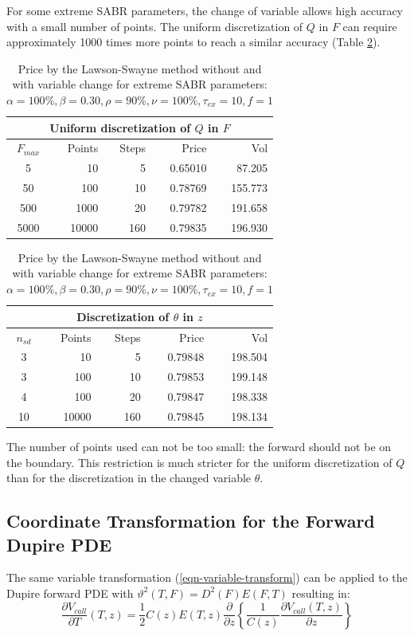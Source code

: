 \documentclass[]{rAMF2e}
\begin{document}
For some extreme SABR parameters, the change of variable allows high accuracy with a small number of points. The uniform discretization of $Q$ in $F$ can require approximately 1000 times more points to reach a similar accuracy (Table \ref{table:discretization}).
\begin{table}[h]
\begin{center}
\begin{tabular}{|c|r|r|r|r|}
	\hline
\multicolumn{5}{|c|}{Uniform discretization of $Q$ in $F$} \\ \hline
$F_{max}$ & Points & Steps & Price & Vol \\
5 & 10 & 5 & 0.65010 & 87.205  \\
50 & 100 & 10 & 0.78769 & 155.773\\
500 & 1000 & 20 & 0.79782 & 191.658 \\
5000 & 10000 & 160 & 0.79835 & 196.930\\
\hline
\end{tabular}
\begin{tabular}{|c|r|r|r|r|}
\hline
\multicolumn{5}{|c|}{Discretization of $\theta$ in $z$} \\ \hline
$n_{sd}$ & Points & Steps & Price & Vol\\
3 & 10 & 5 & 0.79848 & 198.504\\
3 & 100 & 10 & 0.79853 & 199.148\\
4 & 100 & 20 & 0.79847 & 198.338\\
10 & 10000 & 160 & 0.79845 & 198.134\\
\hline
\end{tabular}
\caption{\label{table:discretization}Price by the Lawson-Swayne method without and with variable change for extreme SABR parameters: $\alpha=100\%, \beta=0.30, \rho=90\%, \nu=100\%, \tau_{ex}=10, f=1$}
\end{center}
\end{table} 
The number of points used can not be too small: the forward should not be on the boundary. This restriction is much stricter for the uniform discretization of $Q$ than for the discretization in the changed variable $\theta$.

\subsection{Coordinate Transformation for the Forward Dupire PDE}
The same variable transformation (\ref{eqn-variable-transform}) can be applied to the Dupire forward PDE with $\vartheta^2(T,F)=D^2(F)E(F,T)$ resulting in:
\begin{equation}
\frac{\partial V_{call}}{\partial T}(T,z) = \frac{1}{2} C(z)E(T,z) \frac{\partial}{\partial z} \left\lbrace \frac{1}{C(z)} \frac{\partial V_{call}(T,z)}{\partial z} \right\rbrace
\end{equation}
\end{document}
